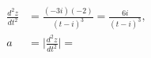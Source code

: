 \documentclass[preview]{standalone}
\begin{document}
\begin{align*}
{} \\ \frac{d^2 z}{dt^2} &= \frac{(-3i)(-2)}{(t-i)^3} = \frac{6i}{(t-i)^3}, \\ a &= \Big|\frac{d^2z}{dt^2}\Big| =
\end{align*}
\end{document}
